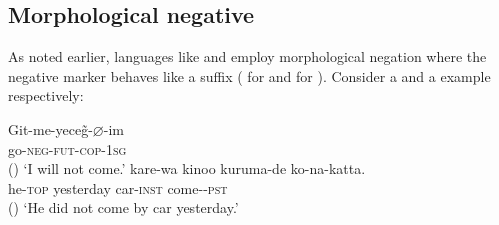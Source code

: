 \documentclass[output=paper,biblatex,babelshorthands,newtxmath,draftmode,colorlinks,citecolor=brown]{langscibook}
\begin{document}
\begin{exe}
\begin{xlist}
\begin{exe}
\begin{xlist}
%




%

\section{Morphological negative}
\label{negation:sec-morphological-negative}

As noted earlier, languages like  and  employ morphological negation
where the negative marker behaves like a suffix (\citealt[]{kelepir} for  and
\citealt{Kato:97,Kato:00} for ). Consider a  and a  example
respectively:

\eal
\ex
\label{negation-turkish-jap}
\gll Git-me-yece\~{g}-$\varnothing$-im \\
     go-\textsc{neg-fut-cop}-\textsc{1sg} \\\hfill()
\glt `I will not come.'
\ex
\gll kare-wa kinoo kuruma-de ko-na-katta. \\
     he-\textsc{top} yesterday car-\textsc{inst} come-\NEG-\textsc{pst} \\\hfill()
\glt `He did not come by car yesterday.'
\zl


\end{xlist}
\end{exe}
\end{xlist}
\end{exe}
\end{document}
